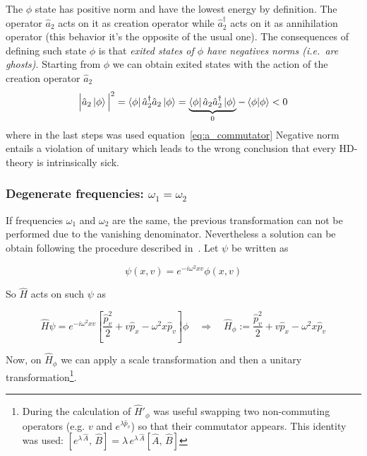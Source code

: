 The $\phi$ state has positive norm and have the lowest energy by definition.
The operator $\hat{a}_2$ acts on it as creation operator while
$\hat{a}_2^{\dagger}$ acts on it as annihilation operator (this behavior it's
the opposite of the usual one). The consequences of defining such state $\phi$
is that \emph{exited states of $\phi$ have negatives norms (i.e.\ are ghosts)}.
Starting from $\phi$ we can obtain exited states with the action of the creation
operator $\hat{a}_2$
\begin{equation*}
  {\Big| \hat{a}_2 \ket{\phi} \Big|}^2 =
  \bra{\phi} \hat{a}_2^{\dagger} \hat{a}_2 \ket{\phi} =
  \underbrace{
    \bra{\phi} \hat{a}_2 \hat{a}_2^{\dagger} \ket{\phi}
  }_{0} - \bra{\phi} \ket{\phi} < 0
\end{equation*}
where in the last steps was used equation~\eqref{eq:a_commutator}
Negative norm entails a violation of unitary which
leads to the wrong conclusion that every HD-theory is intrinsically sick.

\subsubsection{Degenerate frequencies: $\omega_1 = \omega_2$}
If frequencies $\omega_1$ and $\omega_2$ are the same, the previous
transformation can not be performed due to the vanishing denominator.
Nevertheless a solution can be obtain following the procedure described
in~\cite{PU50, Bolonek06}. Let $\psi$ be written as

\begin{equation*}
  \psi(x, v) = e^{-i\omega^2xv}\phi(x,v)
\end{equation*}

So $\hat{H}$ acts on such $\psi$ as

\begin{equation*}
  \hat{H} \psi = e^{-i\omega^2xv}
  \left[\frac{\hat{p}_v^2}{2} + v\hat{p}_x - \omega^2x\hat{p}_v \right] \phi
  \quad \Rightarrow \quad
  \hat{H}_{\phi} :=
  \frac{\hat{p}_v^2}{2} + v\hat{p}_x - \omega^2x\hat{p}_v
\end{equation*}

Now, on $\hat{H}_{\phi}$ we can apply a scale transformation and then a unitary
transformation\footnote{
  During the calculation of $\hat{H}'_{\phi}$ was useful swapping
  two non-commuting operators (e.g. $v$ and $e^{\lambda \hat{p}_v}$)
  so that their commutator appears. This identity was used:
  $\left[e^{\lambda \, \hat{A}}, \, \hat{B}\right] =
  \lambda \, e^{\lambda \, \hat{A}} \left[\hat{A} , \, \hat{B} \right]$
}.

